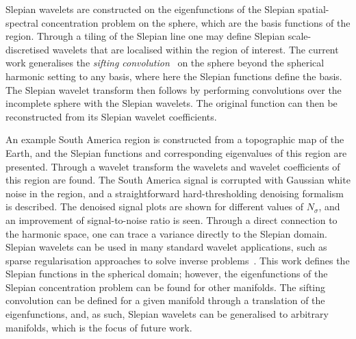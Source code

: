 Slepian wavelets are constructed on the eigenfunctions of the Slepian spatial-spectral concentration problem on the sphere, which are the basis functions of the region.
Through a tiling of the Slepian line one may define Slepian scale-discretised wavelets that are localised within the region of interest.
The current work generalises the \emph{sifting convolution}~\cite{Roddy2021} on the sphere beyond the spherical harmonic setting to any basis, where here the Slepian functions define the basis.
The Slepian wavelet transform then follows by performing convolutions over the incomplete sphere with the Slepian wavelets.
The original function can then be reconstructed from its Slepian wavelet coefficients.

An example South America region is constructed from a topographic map of the Earth, and the Slepian functions and corresponding eigenvalues of this region are presented.
Through a wavelet transform the wavelets and wavelet coefficients of this region are found.
The South America signal is corrupted with Gaussian white noise in the region, and a straightforward hard-thresholding denoising formalism is described.
The denoised signal plots are shown for different values of \(N_{\sigma}\), and an improvement of signal-to-noise ratio is seen.
Through a direct connection to the harmonic space, one can trace a variance directly to the Slepian domain.
Slepian wavelets can be used in many standard wavelet applications, such as sparse regularisation approaches to solve inverse problems~\cite{McEwen2013a,Wallis2017,Price2021}.
This work defines the Slepian functions in the spherical domain; however, the eigenfunctions of the Slepian concentration problem can be found for other manifolds.
The sifting convolution can be defined for a given manifold through a translation of the eigenfunctions, and, as such, Slepian wavelets can be generalised to arbitrary manifolds, which is the focus of future work.

